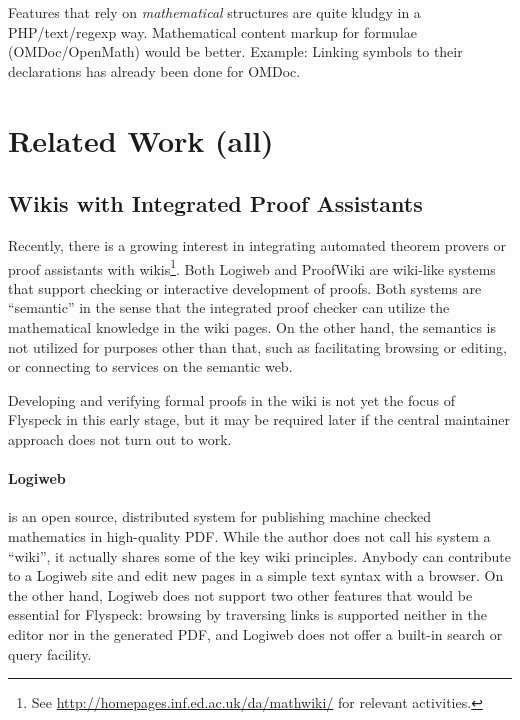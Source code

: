 \documentclass{llncs}
\begin{document}
Features that rely on \emph{mathematical} structures are quite kludgy in a PHP/text/regexp
way.  Mathematical content markup for formulae (OMDoc/OpenMath) would be better.  Example:
Linking symbols to their declarations has already been done for OMDoc.




\section{Related Work (all)}
\label{sec:related}


\subsection{Wikis with Integrated Proof Assistants}
\label{sec:wiki-pa}

Recently, there is a growing interest in integrating automated theorem provers or proof
assistants with wikis\footnote{See \url{http://homepages.inf.ed.ac.uk/da/mathwiki/} for
  relevant activities.}.  Both Logiweb and ProofWiki are wiki-like systems that support
checking or interactive development of proofs.  Both systems are ``semantic'' in the sense
that the integrated proof checker can utilize the mathematical knowledge in the wiki
pages.  On the other hand, the semantics is not utilized for purposes other than that,
such as facilitating browsing or editing, or connecting to services on the semantic
web.  

Developing and verifying formal proofs in the wiki is not yet the focus of Flyspeck in
this early stage, but it may be required later if the central maintainer approach does not
turn out to work.

\paragraph{Logiweb~\cite{Grue:Logiweb07}} is an open source, distributed system for
publishing machine checked mathematics in high-quality PDF.  While the author does not
call his system a ``wiki'', it actually shares some of the key wiki principles.  Anybody
can contribute to a Logiweb site and edit new pages in a simple text syntax with a
browser.  On the other hand, Logiweb does not support two other features that would be
essential for Flyspeck: browsing by traversing links is supported neither in the editor
nor in the generated PDF, and Logiweb does not offer a built-in search or query facility.
\end{document}
